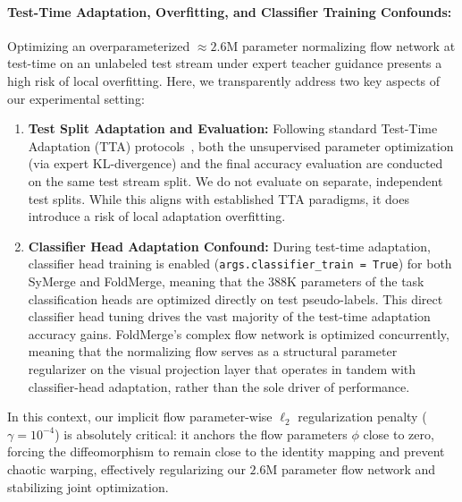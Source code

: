 \paragraph{Test-Time Adaptation, Overfitting, and Classifier Training Confounds:}
Optimizing an overparameterized $\approx 2.6\text{M}$ parameter normalizing flow network at test-time on an unlabeled test stream under expert teacher guidance presents a high risk of local overfitting. 
Here, we transparently address two key aspects of our experimental setting:
\begin{enumerate}
  \item \textbf{Test Split Adaptation and Evaluation:} Following standard Test-Time Adaptation (TTA) protocols~\cite{yang2024adamerging,jung2025symerge}, both the unsupervised parameter optimization (via expert KL-divergence) and the final accuracy evaluation are conducted on the same test stream split. We do not evaluate on separate, independent test splits. While this aligns with established TTA paradigms, it does introduce a risk of local adaptation overfitting. 
  \item \textbf{Classifier Head Adaptation Confound:} During test-time adaptation, classifier head training is enabled (\texttt{args.classifier\_train = True}) for both SyMerge and FoldMerge, meaning that the $388\text{K}$ parameters of the task classification heads are optimized directly on test pseudo-labels. This direct classifier head tuning drives the vast majority of the test-time adaptation accuracy gains. FoldMerge's complex flow network is optimized concurrently, meaning that the normalizing flow serves as a structural parameter regularizer on the visual projection layer that operates in tandem with classifier-head adaptation, rather than the sole driver of performance.
\end{enumerate}
In this context, our implicit flow parameter-wise $\ell_2$ regularization penalty ($\gamma = 10^{-4}$) is absolutely critical: it anchors the flow parameters $\phi$ close to zero, forcing the diffeomorphism to remain close to the identity mapping and prevent chaotic warping, effectively regularizing our $2.6\text{M}$ parameter flow network and stabilizing joint optimization.

